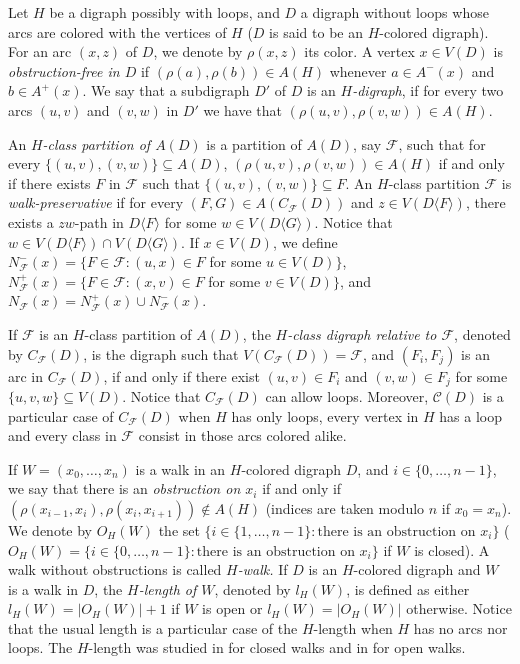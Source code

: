 \documentclass[10pt,a4paper]{article}
\begin{document}
Let $H$ be a digraph possibly with loops, and $D$ a digraph without loops whose arcs are colored with the vertices of $H$ ($D$ is said to be an $H$-colored digraph). For an arc $(x,z)$ of $D$, we denote by $\rho(x,z)$ its color. A vertex $x \in V(D)$ is \emph{obstruction-free in $D$} if $(\rho (a), \rho (b)) \in A(H)$ whenever $a \in A^{-}(x)$ and $b \in A^{+}(x)$. We say that a subdigraph $D'$ of $D$ is an \emph{$H$-digraph}, if for every two arcs $(u,v)$ and $(v,w)$ in $D'$ we have that $(\rho (u,v), \rho (v,w))\in A(H)$. 

An \emph{$H$-class partition of $A(D)$} is a partition of $A(D)$, say $\mathscr{F}$, such that for every $\{ (u,v), (v,w)\} \subseteq A(D)$, $(\rho (u,v), \rho (v,w)) \in A(H)$ if and only if there exists $F$ in $\mathscr{F}$ such that $\{ (u,v),(v,w)\} \subseteq F$. An $H$-class partition $\mathscr{F}$ is \emph{walk-preservative} if  for every $(F,G) \in A(C_{\mathscr{F}}(D))$ and $z \in V(D\langle F \rangle)$, there exists a $zw$-path in $D\langle F \rangle$ for some $w \in  V(D \langle G \rangle )$. Notice that $w \in  V(D \langle F \rangle ) \cap V(D \langle G \rangle )$. If $x \in V(D)$, we define $N^{-}_{\mathscr{F}}(x)=\{ F \in \mathscr{F} : (u,x) \in F$ for some $u \in V(D)\}$, $N^{+}_{\mathscr{F}}(x)=\{ F \in \mathscr{F} : (x,v) \in F$ for some $v \in V(D)\}$, and $N_{\mathscr{F}}(x)=N^{+}_{\mathscr{F}}(x) \cup N^{-}_{\mathscr{F}}(x)$. 

If $\mathscr{F}$ is an $H$-class partition of $A(D)$, the \emph{$H$-class digraph relative to $\mathscr{F}$}, denoted by $C_{\mathscr{F}}(D)$, is the digraph such that $V(C_{\mathscr{F}}(D)) = \mathscr{F}$, and $(F_{i}, F_{j})$ is an arc in $C_{\mathscr{F}}(D)$, if and only if there exist $(u,v) \in F_{i}$ and $(v,w) \in F_{j}$ for some $\{ u, v, w \} \subseteq V(D)$. 
Notice that $C_{\mathscr{F}}(D)$ can allow loops. Moreover, $\mathscr{C}(D)$ is a particular case of $C_{\mathscr{F}}(D)$ when $H$ has only loops, every vertex in $H$ has a loop and every class in $\mathscr{F}$ consist in those arcs colored alike. 

If $W=(x_{0}, \ldots , x_{n})$ is a walk in an $H$-colored digraph $D$, and $i \in \{0, \ldots , n-1 \}$, we say that there is an \textit{obstruction on $x_{i}$} if and only if $(\rho (x_{i-1}, x_{i}), \rho (x_{i}, x_{i+1})) \notin A(H)$ (indices are taken modulo $n$ if $x_{0}=x_{n}$). 
We denote by $O_{H}(W)$ the set $\{ i \in \{ 1, \ldots , n-1\} : \text{there is an obstruction on }x_{i} \}$ ($O_{H}(W)=\{ i \in \{ 0, \ldots , n-1\} : \text{there is an obstruction on }x_{i} \}$ if $W$ is closed).
A walk without obstructions is called \textit{$H$-walk.}
If $D$ is an $H$-colored digraph and $W$ is a walk in $D$, the \textit{$H$-length of $W$}, denoted by $l_{H}(W)$, is defined as either $l_{H}(W)= |O_{H}(W)|+1$ if $W$ is open or  $l_{H}(W)= |O_{H}(W)|$ otherwise. 
Notice that the usual length is a particular case of the $H$-length when $H$ has no arcs nor loops. The $H$-length was studied in \cite{12} for closed walks and in \cite{20} for open walks.
\end{document}
